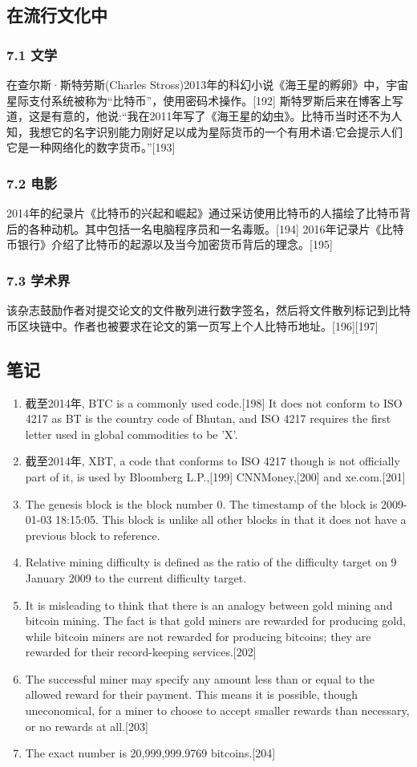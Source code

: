 \subsection{在流行文化中}
\subsubsection{7.1 文学}
在查尔斯·斯特劳斯(Charles Stross)2013年的科幻小说《海王星的孵卵》中，宇宙星际支付系统被称为“比特币”，使用密码术操作。[192] 斯特罗斯后来在博客上写道，这是有意的，他说:“我在2011年写了《海王星的幼虫》。比特币当时还不为人知，我想它的名字识别能力刚好足以成为星际货币的一个有用术语:它会提示人们它是一种网络化的数字货币。”[193]
\subsubsection{7.2 电影}
2014年的纪录片《比特币的兴起和崛起》通过采访使用比特币的人描绘了比特币背后的各种动机。其中包括一名电脑程序员和一名毒贩。[194] 2016年记录片《比特币银行》介绍了比特币的起源以及当今加密货币背后的理念。[195]
\subsubsection{7.3 学术界}
该杂志鼓励作者对提交论文的文件散列进行数字签名，然后将文件散列标记到比特币区块链中。作者也被要求在论文的第一页写上个人比特币地址。[196][197]

\subsection{笔记}
\begin{enumerate}
\item 截至2014年, BTC is a commonly used code.[198] It does not conform to ISO 4217 as BT is the country code of Bhutan, and ISO 4217 requires the first letter used in global commodities to be 'X'.
\item 截至2014年, XBT, a code that conforms to ISO 4217 though is not officially part of it, is used by Bloomberg L.P.,[199] CNNMoney,[200] and xe.com.[201]
\item The genesis block is the block number 0. The timestamp of the block is 2009-01-03 18:15:05. This block is unlike all other blocks in that it does not have a previous block to reference.
\item Relative mining difficulty is defined as the ratio of the difficulty target on 9 January 2009 to the current difficulty target.
\item It is misleading to think that there is an analogy between gold mining and bitcoin mining. The fact is that gold miners are rewarded for producing gold, while bitcoin miners are not rewarded for producing bitcoins; they are rewarded for their record-keeping services.[202]
\item The successful miner may specify any amount less than or equal to the allowed reward for their payment. This means it is possible, though uneconomical, for a miner to choose to accept smaller rewards than necessary, or no rewards at all.[203]
\item The exact number is 20,999,999.9769 bitcoins.[204]
\end{enumerate}

